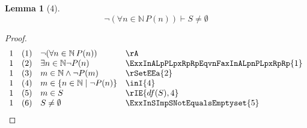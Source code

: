 \documentclass{book}
\theoremstyle{plain}
\newtheorem*{lemma}{Lemma} %
\theoremstyle{remark}
\theoremstyle{definition}
\begin{document}
\label{PLpZeroRpwFanInNaturalLpPLpnRpToPLpnPlusOneRpRpImpFanInNaturalPLpnRpLoooo}
\begin{lemma}[4]
\[\neg (\forall n \in \mathbb{N} \, P(n))\vdash S\neq\emptyset\]
\end{lemma}
\begin{proof}
	\[
	\begin{array}{llll}
		1 &  (1) & \neg (\forall n \in \mathbb{N} \, P(n)) & \rA \\
		1 &  (2) & \exists n \in \mathbb{N} \neg P(n) & \ExxInALpPLpxRpRpEqvnFaxInALpnPLpxRpRp{1} \\
		1 &  (3) & m\in\mathbb{N}\land \neg P(m) & \rSetEEa{2} \\
		1 &  (4) & m\in \{n\in\mathbb{N}\mid \neg P(n)\} & \inI{4} \\
		1 &  (5) & m\in S & \rIE{df(S),4} \\
		1 &  (6) & S\neq\emptyset & \ExxInSImpSNotEqualsEmptyset{5} \\	
	\end{array}
	\]
\end{proof}
\end{document}
